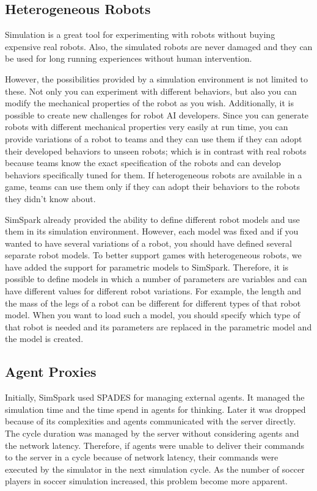 \documentclass{llncs}
\begin{document}
\subsection{Heterogeneous Robots}
Simulation is a great tool for experimenting with robots without buying expensive 
real robots. Also, the simulated robots are never damaged and they can be used for long 
running experiences without human intervention. 

However, the possibilities provided by a simulation environment is 
not limited to these. Not only you can experiment with different behaviors, but
also you can modify the mechanical properties of the robot as you wish. Additionally,
it is possible to create new challenges for robot AI developers. Since you can
generate robots with different mechanical properties very easily at run time, 
you can provide variations of a robot to teams and they can use them if they can
adopt their developed behaviors to unseen robots; which is in contrast with 
real robots because teams know the exact specification of the robots and
can develop behaviors specifically tuned for them. If heterogeneous 
robots are available in a game, teams can use them only if they can adopt
their behaviors to the robots they didn't know about.

SimSpark already provided the ability to define different robot models and 
use them in its simulation environment. However, each model was fixed and if you
wanted to have several variations of a robot, you should have defined several 
separate robot models. To better support games with heterogeneous robots, we have
added the support for parametric models to SimSpark. Therefore, it is possible to
define models in which a number of parameters are variables and can have different
values for different robot variations. For example, the length and the mass of the 
legs of a robot can be different for different types of that robot model. 
When you want to load such a model, you should 
specify which type of that robot is needed and its parameters are replaced in the
parametric model and the model is created. 

\subsection{Agent Proxies}
Initially, SimSpark used SPADES\cite{riley2003spades} for managing external agents. It
managed the simulation time and the time spend in agents for thinking. Later it was
dropped because of its complexities and agents communicated with the server directly.
The cycle duration was managed by the server without considering agents and the network
latency. Therefore, if agents were unable to deliver their commands to the server in a
cycle because of network latency, their commands were executed by the simulator
in the next simulation cycle. As the number of soccer players in soccer simulation 
increased, this problem become more apparent.
\end{document}
